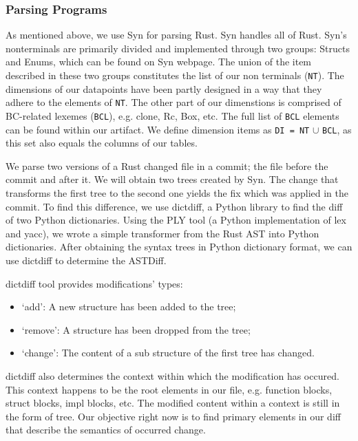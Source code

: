 \subsubsection{Parsing Programs}

As mentioned above, we use Syn for parsing Rust. Syn handles all of Rust. Syn's nonterminals are primarily divided and implemented through two groups: Structs and Enums, which can be found on Syn webpage. The union of the item described in these two groups constitutes the list of our non terminals (\verb+NT+). The dimensions of our datapoints have been partly designed in a way that they adhere to the elements of \verb+NT+. The other part of our dimenstions is comprised of BC-related lexemes (\verb+BCL+), e.g. clone, Rc, Box, etc. The full list of \verb+BCL+ elements can be found within our artifact. We define dimension items as \verb+DI = NT+ $\cup$ \verb+BCL+, as this set also equals the columns of our tables.

We parse two versions of a Rust changed file in a commit; the file before the commit and after it. We will obtain two trees created by Syn. The change that transforms the first tree to the second one yields the fix which was applied in the commit. To find this difference, we use dictdiff, a Python library to find the diff of two Python dictionaries. Using the PLY tool (a Python implementation of lex and yacc), we wrote a simple transformer from the Rust AST into Python dictionaries. After obtaining the syntax trees in Python dictionary format, we can use dictdiff to determine the ASTDiff. 

dictdiff tool provides modifications' types: 
\begin{itemize}
\item `add': A new structure has been added to the tree; 
\item `remove': A structure has been dropped from the tree; 
\item `change': The content of a sub structure of the first tree has changed.
\end{itemize}
dictdiff also determines the context within which the modification has occured. This context happens to be the root elements in our file, e.g. function blocks, struct blocks, impl blocks, etc. The modified content within a context is still in the form of tree. Our objective right now is to find primary elements in our diff that describe the semantics of occurred change.


